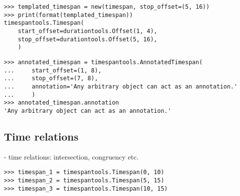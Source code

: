 \begin{singlespacing}
\vspace{-0.5\baselineskip}
\begin{lstlisting}
>>> templated_timespan = new(timespan, stop_offset=(5, 16))
>>> print(format(templated_timespan))
timespantools.Timespan(
    start_offset=durationtools.Offset(1, 4),
    stop_offset=durationtools.Offset(5, 16),
    )
\end{lstlisting}
\end{singlespacing}

\begin{comment}
<abjad>
annotated_timespan = timespantools.AnnotatedTimespan(
    start_offset=(1, 8),
    stop_offset=(7, 8),
    annotation='Any arbitrary object can act as an annotation.'
    )
annotated_timespan.annotation
</abjad>
\end{comment}

\begin{singlespacing}
\vspace{-0.5\baselineskip}
\begin{lstlisting}
>>> annotated_timespan = timespantools.AnnotatedTimespan(
...     start_offset=(1, 8),
...     stop_offset=(7, 8),
...     annotation='Any arbitrary object can act as an annotation.'
...     )
>>> annotated_timespan.annotation
'Any arbitrary object can act as an annotation.'
\end{lstlisting}
\end{singlespacing}

\subsection{Time relations}

- time relations: intersection, congruency etc.

\begin{comment}
<abjad>
timespan_1 = timespantools.Timespan(0, 10)
timespan_2 = timespantools.Timespan(5, 15)
timespan_3 = timespantools.Timespan(10, 15)
</abjad>
\end{comment}

\begin{singlespacing}
\vspace{-0.5\baselineskip}
\begin{lstlisting}
>>> timespan_1 = timespantools.Timespan(0, 10)
>>> timespan_2 = timespantools.Timespan(5, 15)
>>> timespan_3 = timespantools.Timespan(10, 15)
\end{lstlisting}
\end{singlespacing}

